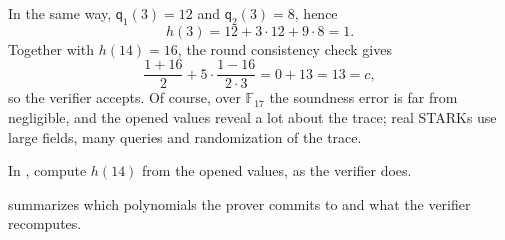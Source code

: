 \documentclass[../../book]{subfiles}
\begin{document}
\begin{example}
  In the same way, $\mathsf{q}_1(3) = 12$ and $\mathsf{q}_2(3) = 8$, hence
  \begin{equation*}
    h(3) = 12 + 3 \cdot 12 + 9 \cdot 8 = 1.
  \end{equation*}
  Together with $h(14) = 16$, the round consistency check gives
  \begin{equation*}
    \frac{1 + 16}{2} + 5 \cdot \frac{1 - 16}{2 \cdot 3} = 0 + 13 = 13 = c,
  \end{equation*}
  so the verifier accepts.
  Of course, over $\mathbb{F}_{17}$ the soundness error is far from negligible, and the opened values reveal a lot about the trace; real STARKs use large fields, many queries and randomization of the trace.
\end{example}

\begin{exercise}
  In , compute $h(14)$ from the opened values, as the verifier does.
\end{exercise}

 summarizes which polynomials the prover commits to and what the verifier recomputes.
\end{document}
